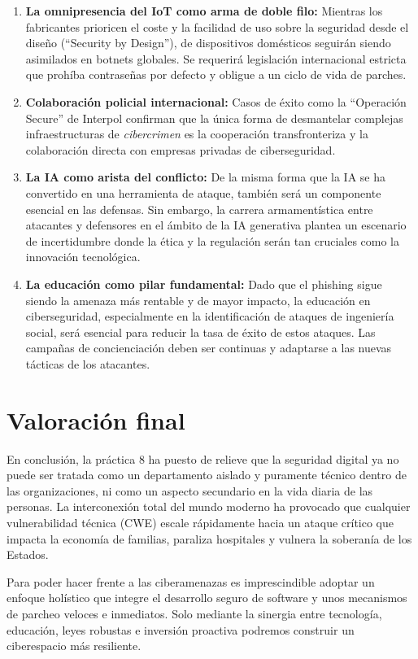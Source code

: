 \begin{enumerate}
    \item \textbf{La omnipresencia del IoT como arma de doble filo:} Mientras los fabricantes prioricen el coste y la facilidad de uso sobre la seguridad desde el diseño (``Security by Design''), de dispositivos domésticos seguirán siendo asimilados en botnets globales. Se requerirá legislación internacional estricta que prohíba contraseñas por defecto y obligue a un ciclo de vida de parches.
    \item \textbf{Colaboración policial internacional:} Casos de éxito como la ``Operación Secure'' de Interpol confirman que la única forma de desmantelar complejas infraestructuras de \textit{cibercrimen} es la cooperación transfronteriza y la colaboración directa con empresas privadas de ciberseguridad.
    \item \textbf{La IA como arista del conflicto:} De la misma forma que la IA se ha convertido en una herramienta de ataque, también será un componente esencial en las defensas. Sin embargo, la carrera armamentística entre atacantes y defensores en el ámbito de la IA generativa plantea un escenario de incertidumbre donde la ética y la regulación serán tan cruciales como la innovación tecnológica.
    \item \textbf{La educación como pilar fundamental:} Dado que el phishing sigue siendo la amenaza más rentable y de mayor impacto, la educación en ciberseguridad, especialmente en la identificación de ataques de ingeniería social, será esencial para reducir la tasa de éxito de estos ataques. Las campañas de concienciación deben ser continuas y adaptarse a las nuevas tácticas de los atacantes.
\end{enumerate}

\section{Valoración final}
En conclusión, la práctica 8 ha puesto de relieve que la seguridad digital ya no puede ser tratada como un departamento aislado y puramente técnico dentro de las organizaciones, ni como un aspecto secundario en la vida diaria de las personas. La interconexión total del mundo moderno ha provocado que cualquier vulnerabilidad técnica (CWE) escale rápidamente hacia un ataque crítico que impacta la economía de familias, paraliza hospitales y vulnera la soberanía de los Estados. 

Para poder hacer frente a las ciberamenazas es imprescindible adoptar un enfoque holístico que integre el desarrollo seguro de software y unos mecanismos de parcheo veloces e inmediatos. Solo mediante la sinergia entre tecnología, educación, leyes robustas e inversión proactiva podremos construir un ciberespacio más resiliente.

